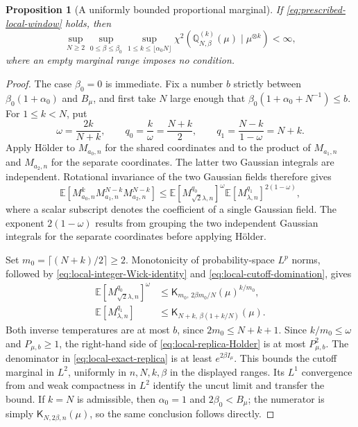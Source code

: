 \documentclass[11pt,reqno]{amsart}
\numberwithin{equation}{section}
\theoremstyle{plain}
\newtheorem{prop}[prop]{Proposition}
\theoremstyle{definition}
\newcommand{\E}{\mathbb E}
\newcommand{\Q}{\mathbb Q}
\newcommand{\be}{\beta}
\newcommand{\al}{\alpha}
\newcommand{\K}{\mathsf K}
\begin{document}
\begin{prop}[A uniformly bounded proportional marginal]
\label{prop:local-replica-anchor}
If \eqref{eq:prescribed-local-window} holds, then
\begin{equation}
 \sup_{N\geq2}\sup_{0\leq\be\leq\be_0}
 \sup_{1\leq k\leq\lfloor\al_0N\rfloor}
 \chi^2\!\left(\Q_{N,\be}^{(k)}(\mu)\mid\mu^{\otimes k}\right)<\infty,
 \label{eq:local-replica-anchor}
\end{equation}
where an empty marginal range imposes no condition.
\end{prop}
\begin{proof}
The case $\be_0=0$ is immediate. Fix a number $b$ strictly between $\be_0(1+\al_0)$ and $B_\mu$, and first take $N$ large enough that $\be_0(1+\al_0+N^{-1})\leq b$. For $1\leq k<N$, put
\begin{equation}
 \omega=\frac{2k}{N+k},\qquad
 q_0=\frac{k}{\omega}=\frac{N+k}{2},\qquad
 q_1=\frac{N-k}{1-\omega}=N+k.
 \label{eq:local-replica-Holder-exponents}
\end{equation}
Apply H\"older to $M_{a_0,n}$ for the shared coordinates and to the product of $M_{a_1,n}$ and $M_{a_2,n}$ for the separate coordinates. The latter two Gaussian integrals are independent. Rotational invariance of the two Gaussian fields therefore gives
\begin{equation}
 \E[M_{a_0,n}^kM_{a_1,n}^{N-k}M_{a_2,n}^{N-k}]
 \leq \E[M_{\sqrt2\lambda,n}^{q_0}]^\omega
       \E[M_{\lambda,n}^{q_1}]^{2(1-\omega)},
 \label{eq:local-replica-Holder}
\end{equation}
where a scalar subscript denotes the coefficient of a single Gaussian field. The exponent $2(1-\omega)$ results from grouping the two independent Gaussian integrals for the separate coordinates before applying H\"older.

Set $m_0=\lceil(N+k)/2\rceil\geq2$. Monotonicity of probability-space $L^p$ norms, followed by \eqref{eq:local-integer-Wick-identity} and \eqref{eq:local-cutoff-domination}, gives
\begin{align}
 \E[M_{\sqrt2\lambda,n}^{q_0}]^\omega
 &\leq\K_{m_0,\,2\be m_0/N}(\mu)^{k/m_0},
 \label{eq:local-shared-moment-temperature}\\
 \E[M_{\lambda,n}^{q_1}]
 &\leq\K_{N+k,\,\be(1+k/N)}(\mu).
 \label{eq:local-private-moment-temperature}
\end{align}
Both inverse temperatures are at most $b$, since $2m_0\leq N+k+1$. Since $k/m_0\leq\omega$ and $P_{\mu,b}\geq1$, the right-hand side of \eqref{eq:local-replica-Holder} is at most $P_{\mu,b}^{2}$. The denominator in \eqref{eq:local-exact-replica} is at least $e^{2\be I_\mu}$. This bounds the cutoff marginal in $L^2$, uniformly in $n,N,k,\be$ in the displayed ranges. Its $L^1$ convergence from  and weak compactness in $L^2$ identify the uncut limit and transfer the bound. If $k=N$ is admissible, then $\al_0=1$ and $2\be_0<B_\mu$; the numerator is simply $\K_{N,2\be,n}(\mu)$, so the same conclusion follows directly.


\end{proof}
\end{document}
